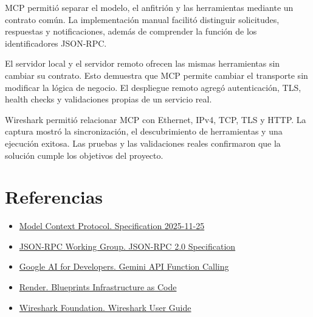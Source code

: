 \documentclass[12pt]{article}
\begin{document}
MCP permitió separar el modelo, el anfitrión y las herramientas mediante un contrato común. La implementación manual facilitó distinguir solicitudes, respuestas y notificaciones, además de comprender la función de los identificadores JSON-RPC.

El servidor local y el servidor remoto ofrecen las mismas herramientas sin cambiar su contrato. Esto demuestra que MCP permite cambiar el transporte sin modificar la lógica de negocio. El despliegue remoto agregó autenticación, TLS, health checks y validaciones propias de un servicio real.

Wireshark permitió relacionar MCP con Ethernet, IPv4, TCP, TLS y HTTP. La captura mostró la sincronización, el descubrimiento de herramientas y una ejecución exitosa. Las pruebas y las validaciones reales confirmaron que la solución cumple los objetivos del proyecto.

\section{Referencias}

\begin{itemize}
    \item \href{https://modelcontextprotocol.io/specification/2025-11-25}{Model Context Protocol. Specification 2025-11-25}
    \item \href{https://www.jsonrpc.org/specification}{JSON-RPC Working Group. JSON-RPC 2.0 Specification}
    \item \href{https://ai.google.dev/gemini-api/docs/function-calling}{Google AI for Developers. Gemini API Function Calling}
    \item \href{https://render.com/docs/infrastructure-as-code}{Render. Blueprints Infrastructure as Code}
    \item \href{https://www.wireshark.org/docs/wsug_html_chunked/}{Wireshark Foundation. Wireshark User Guide}
\end{itemize}
\end{document}
